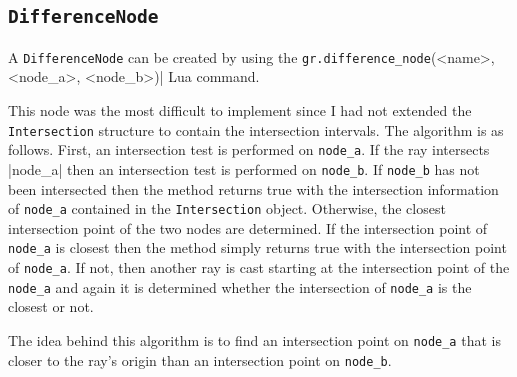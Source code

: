 \subsection*{\verb|DifferenceNode|}
A \verb|DifferenceNode| can be created by using the
\verb|gr.difference_node|(<name>, <node_a>, <node_b>)| Lua command.

This node was the most difficult to implement since I had not extended the
\verb|Intersection| structure to contain the intersection intervals. The
algorithm is as follows. First, an intersection test is performed on 
\verb|node_a|. If the ray intersects \vert|node_a| then an intersection test is
performed on \verb|node_b|. If \verb|node_b| has not been intersected then the
method returns true with the intersection information of \verb|node_a| contained
in the \verb|Intersection| object. Otherwise, the closest intersection point of 
the two nodes are determined. If the intersection point of \verb|node_a| is 
closest then the method simply returns true with the intersection point of 
\verb|node_a|. If not, then another ray is cast starting at the intersection
point of the \verb|node_a| and again it is determined whether the intersection
of \verb|node_a| is the closest or not.

The idea behind this algorithm is to find an intersection point on \verb|node_a|
that is closer to the ray's origin than an intersection point on \verb|node_b|.


